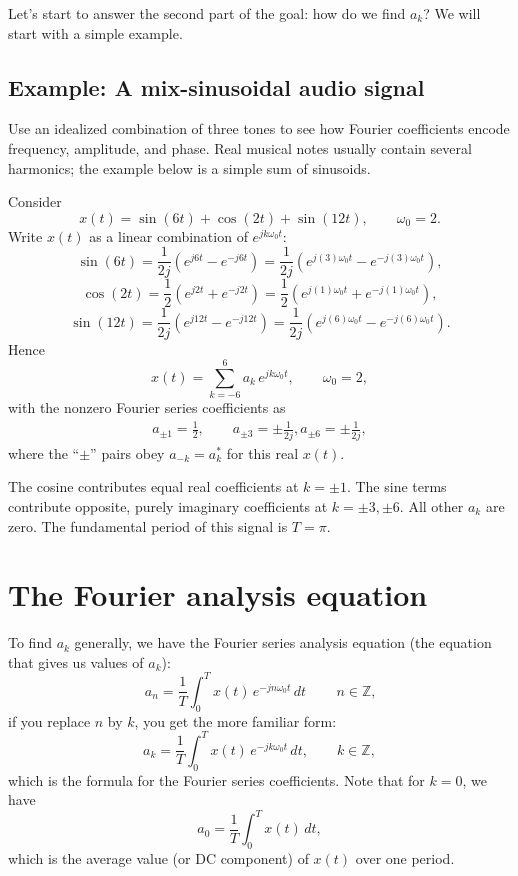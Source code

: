 Let's start to answer the second part of the goal: how do we find $a_k$? We will start with a simple example.
\subsection{Example: A mix-sinusoidal audio signal}
Use an idealized combination of three tones to see how Fourier coefficients encode frequency, amplitude, and phase. Real musical notes usually contain several harmonics; the example below is a simple sum of sinusoids.

Consider
\[
x(t)=\sin(6t)+\cos(2t)+\sin(12t),\qquad \omega_0=2.
\]
Write $x(t)$ as a linear combination of $e^{jk\omega_0 t}$:
\[
\sin(6t)=\frac{1}{2j}\!\left(e^{j6t}-e^{-j6t}\right)
= \frac{1}{2j}\!\left(e^{j(3)\omega_0 t}-e^{-j(3)\omega_0 t}\right),
\]
\[
\cos(2t)=\frac{1}{2}\!\left(e^{j2t}+e^{-j2t}\right)
=\frac{1}{2}\!\left(e^{j(1)\omega_0 t}+e^{-j(1)\omega_0 t}\right),
\]
\[
\sin(12t)=\frac{1}{2j}\!\left(e^{j12t}-e^{-j12t}\right)
= \frac{1}{2j}\!\left(e^{j(6)\omega_0 t}-e^{-j(6)\omega_0 t}\right).
\]
Hence
\[
x(t)=\sum_{k=-6}^{6} a_k\,e^{jk\omega_0 t},\qquad \omega_0=2,
\]
with the nonzero Fourier series coefficients as
\[
\begin{aligned}
a_{\pm 1}=\frac{1}{2},\qquad a_{\pm 3}=\pm \frac{1}{2j},a_{\pm 6}=\pm \frac{1}{2j},
\end{aligned}
\]
where the ``$\pm$'' pairs obey $a_{-k}=a_k^\ast$ for this real $x(t)$.

The cosine contributes equal real coefficients at $k=\pm1$. The sine terms contribute opposite, purely imaginary coefficients at $k=\pm3,\pm6$. All other $a_k$ are zero. The fundamental period of this signal is $T=\pi$.

\section{The Fourier analysis equation}
\label{sec:w6l2-analysis}
To find $a_k$ generally, we have the Fourier series analysis equation (the equation that gives us values of $a_k$):
\[
\,a_n=\frac{1}{T}\int_{0}^{T} x(t)\,e^{-jn\omega_0 t}\,dt\,
\qquad n\in\mathbb{Z},
\]
if you replace $n$ by $k$, you get the more familiar form:
\[
a_k=\frac{1}{T}\int_{0}^{T} x(t)\,e^{-jk\omega_0 t}\,dt,
\qquad k\in\mathbb{Z},
\]
which is the formula for the Fourier series coefficients.
Note that for $k=0$, we have
\[
a_0=\frac{1}{T}\int_{0}^{T} x(t)\,dt,
\]
which is the average value (or DC component) of $x(t)$ over one period.

